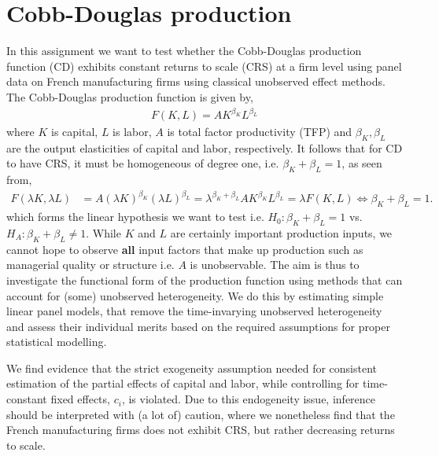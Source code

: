 \section{Cobb-Douglas production} \label{sec:intro}

In this assignment we want to test whether the Cobb-Douglas production function (CD) exhibits constant returns to scale (CRS) at a firm level using panel data on French manufacturing firms using classical unobserved effect methods. The Cobb-Douglas production function is given by,
\begin{align} \label{eq:CD}
    F(K,L) = A K^{\beta_K} L^{\beta_L}
\end{align}
where $K$ is capital, $L$ is labor, $A$ is total factor productivity (TFP) and $\beta_K, \beta_L$ are the output elasticities of capital and labor, respectively.
It follows that for CD to have CRS, it must be homogeneous of degree one, i.e. $\beta_K + \beta_L = 1$, as seen from,
\begin{align*} 
    F(\lambda K, \lambda L) &= A (\lambda K)^{\beta_K} (\lambda L)^{\beta_L} = \lambda^{\beta_K + \beta_L} A K^{\beta_K} L^{\beta_L} = \lambda F(K,L) \iff \beta_K + \beta_L = 1.
\end{align*} 
which forms the linear hypothesis we want to test i.e. $H_0: \beta_K + \beta_L = 1$ vs. $H_A: \beta_K + \beta_L \neq 1$.
While $K$ and $L$ are certainly important production inputs, we cannot hope to observe \textbf{all} input factors that make up production such as managerial quality or structure i.e. $A$ is unobservable. The aim is thus to investigate the functional form of the production function using methods that can account for (some) unobserved heterogeneity. We do this by estimating simple linear panel models, that remove the time-invarying unobserved heterogeneity and assess their individual merits based on the required assumptions for proper statistical modelling.

We find evidence that the strict exogeneity assumption needed for consistent estimation of the partial effects of capital and labor, while controlling for time-constant fixed effects, $c_i$, is violated. Due to this endogeneity issue, inference should be interpreted with (a lot of) caution, where we nonetheless find that the French manufacturing firms does not exhibit CRS, but rather decreasing returns to scale. 

